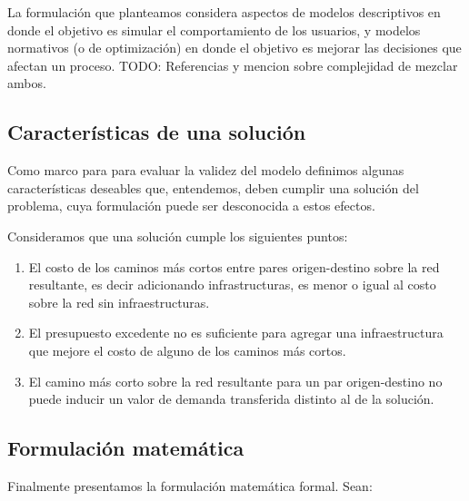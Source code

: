 \documentclass{article}
\begin{document}
  La formulación que planteamos considera aspectos de modelos descriptivos en donde el objetivo es simular el comportamiento de los usuarios, y modelos normativos (o de optimización) en donde el objetivo es mejorar las decisiones que afectan un proceso. TODO: Referencias y mencion sobre complejidad de mezclar ambos.

  \subsection{Características de una solución}

  Como marco para para evaluar la validez del modelo definimos algunas características deseables que, entendemos, deben cumplir una solución del problema, cuya formulación puede ser desconocida a estos efectos.

  Consideramos que una solución cumple los siguientes puntos:

  \begin{enumerate}
      \item{El costo de los caminos más cortos entre pares origen-destino sobre la red resultante, es decir adicionando infrastructuras, es menor o igual al costo sobre la red sin infraestructuras.}
    \item{\label{budgetexcess} El presupuesto excedente no es suficiente para agregar una infraestructura que mejore el costo de alguno de los caminos más cortos.}
    \item{El camino más corto sobre la red resultante para un par origen-destino no puede inducir un valor de demanda transferida distinto al de la solución.}
  \end{enumerate}

  \subsection{Formulación matemática}

  Finalmente presentamos la formulación matemática formal. Sean:
\end{document}
